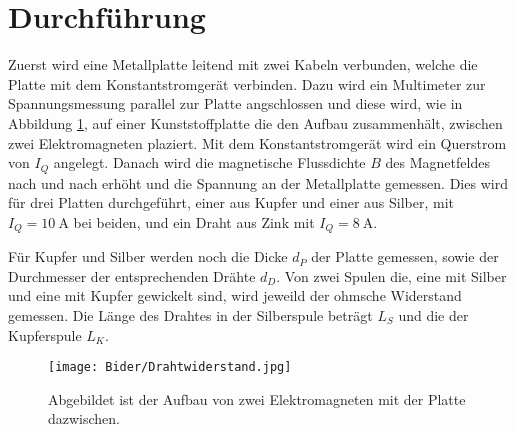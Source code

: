 \section{Durchführung}
\label{sec:Durchführung}

Zuerst wird eine Metallplatte leitend mit zwei Kabeln verbunden, welche die Platte mit dem Konstantstromgerät verbinden. 
Dazu wird ein Multimeter zur Spannungsmessung parallel zur Platte angschlossen und diese wird, wie in Abbildung \ref{fig:Elektromagnet}, auf einer Kunststoffplatte die den Aufbau zusammenhält, zwischen zwei Elektromagneten plaziert.
Mit dem Konstantstromgerät wird ein Querstrom von $I_Q$ angelegt.
Danach wird die magnetische Flussdichte $B$ des Magnetfeldes nach und nach erhöht und die Spannung an der Metallplatte gemessen.
Dies wird für drei Platten durchgeführt, einer aus Kupfer und einer aus Silber, mit $I_Q=\qty{10}{\ampere}$ bei beiden, und ein Draht aus Zink mit $I_Q=\qty{8}{\ampere}$.

Für Kupfer und Silber werden noch die Dicke $d_P$ der Platte gemessen, sowie der Durchmesser der entsprechenden Drähte $d_D$.
Von zwei Spulen die, eine mit Silber und eine mit Kupfer gewickelt sind, wird jeweild der ohmsche Widerstand gemessen.
Die Länge des Drahtes in der Silberspule beträgt $L_S$ und die der Kupferspule $L_K$.

\begin{figure}[H]
    \centering
    \texttt{[image: Bider/Drahtwiderstand.jpg]}
    \caption{Abgebildet ist der Aufbau von zwei Elektromagneten mit der Platte dazwischen.}
    \label{fig:Elektromagnet}
\end{figure}